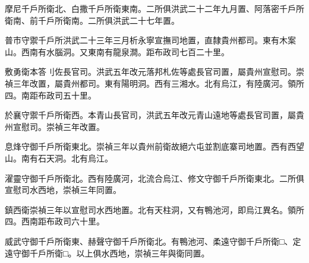 摩尼千戶所衛北、白撒千戶所衛東南。二所俱洪武二十二年九月置、阿落密千戶所衛南、前千戶所衛南。二所俱洪武二十七年置。

普市守禦千戶所洪武二十三年三月析永寧宣撫司地置，直隸貴州都司。東有木案山。西南有水腦洞。又東南有龍泉澗。距布政司七百二十里。

敷勇衛本答刂佐長官司。洪武五年改元落邦札佐等處長官司置，屬貴州宣慰司。崇禎三年改置，屬貴州都司。東有陽明洞。西有三湘水。北有烏江，有陸廣河。領所四。南距布政司五十里。

於襄守禦千戶所衛西。本青山長官司，洪武五年改元青山遠地等處長官司置，屬貴州宣慰司。崇禎三年改置。

息烽守御千戶所衛東北。崇禎三年以貴州前衛故絕六屯並割底寨司地置。西有西望山。南有石天洞。北有烏江。

濯靈守御千戶所衛北。西有陸廣河，北流合烏江、修文守御千戶所衛東北。二所俱宣慰司水西地，崇禎三年同置。

鎮西衛崇禎三年以宣慰司水西地置。北有天柱洞，又有鴨池河，即烏江異名。領所四。西南距布政司六十里。

威武守御千戶所衛東、赫聲守御千戶所衛北。有鴨池河、柔遠守御千戶所衛□、定遠守御千戶所衛□。以上俱水西地，崇禎三年與衛同置。
